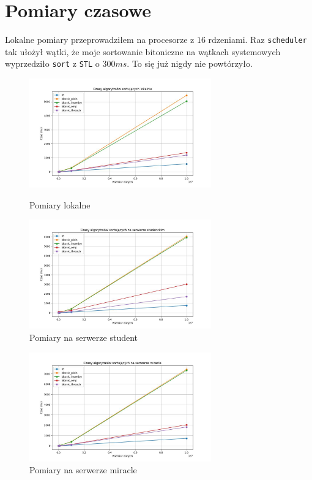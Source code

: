 \documentclass{article}
\begin{document}
\newpage

\section*{Pomiary czasowe}
Lokalne pomiary przeprowadziłem na procesorze z $16$ rdzeniami. Raz \texttt{scheduler} tak ułożył wątki, że moje sortowanie bitoniczne na wątkach systemowych wyprzedziło \texttt{sort} z \texttt{STL} o $300ms$. To się już nigdy nie powtórzyło. 
\begin{figure}[htp]
    \centering
    \includegraphics[width=0.7\textwidth]{czasy_lokalne.jpg}
    \caption{Pomiary lokalne}
    \centering
    \includegraphics[width=0.7\textwidth]{czasy_student.jpg}
    \caption{Pomiary na serwerze student}
\end{figure}
\newpage 

\begin{figure}[htp]
    \centering
    \includegraphics[width=0.7\textwidth]{czasy_miracle.jpg}
    \caption{Pomiary na serwerze miracle}
\end{figure}
\end{document}
